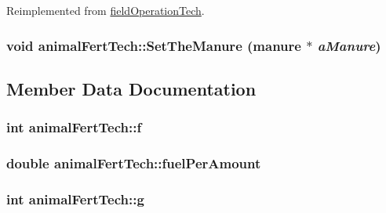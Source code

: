 Reimplemented from \hyperlink{classfield_operation_tech_a2a2c416f3f3fe8ceb2f1f1b63c149a09}{fieldOperationTech}.\hypertarget{classanimal_fert_tech_a70363b032f8bfba796448c7fd4ec0d24}{
\subsubsection[{SetTheManure}]{\setlength{\rightskip}{0pt plus 5cm}void animalFertTech::SetTheManure ({\bf manure} $\ast$ {\em aManure})}}
\label{classanimal_fert_tech_a70363b032f8bfba796448c7fd4ec0d24}


\subsection{Member Data Documentation}
\hypertarget{classanimal_fert_tech_a6692fe2b1bb0935b3eab56dc38f69963}{
\subsubsection[{f}]{\setlength{\rightskip}{0pt plus 5cm}int {\bf animalFertTech::f}}}
\label{classanimal_fert_tech_a6692fe2b1bb0935b3eab56dc38f69963}
\hypertarget{classanimal_fert_tech_aeb6873df46d03d1b78f31198ad4cf6a1}{
\subsubsection[{fuelPerAmount}]{\setlength{\rightskip}{0pt plus 5cm}double {\bf animalFertTech::fuelPerAmount}}}
\label{classanimal_fert_tech_aeb6873df46d03d1b78f31198ad4cf6a1}
\hypertarget{classanimal_fert_tech_acebfd541ba0220e8aa692defae5d2445}{
\subsubsection[{g}]{\setlength{\rightskip}{0pt plus 5cm}int {\bf animalFertTech::g}}}

